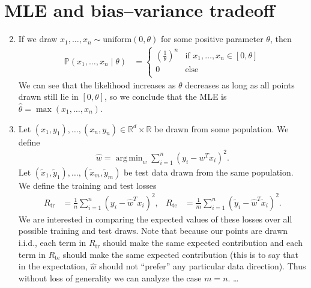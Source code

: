 \documentclass[11pt,letterpaper]{article}
\DeclareMathOperator*{\argmin}{arg\,min}
\numberwithin{equation}{section}
\numberwithin{figure}{section}
\begin{document}
\section{MLE and bias--variance tradeoff}

\begin{enumerate}[label=\arabic*.]
	\setcounter{enumi}{1}
	\item If we draw $x_1,\ldots,x_n \sim \text{uniform}(0,\theta)$ for some positive parameter $\theta$, then
	\begin{align*}
		\mathbb{P}(x_1,\ldots,x_n \mid \theta) &= \left\{\begin{array}{ll}
			\left(\frac{1}{\theta}\right)^n & \text{if } x_1,\ldots,x_n \in [0,\theta]\\
			0 & \text{else}\\
			\end{array}\right.
	\end{align*}
	We can see that the likelihood increases as $\theta$ decreases as long as all points drawn still lie in $[0,\theta]$, so we conclude that the MLE is $\hat{\theta} = \max(x_1,\ldots,x_n)$.




















	\item Let $(x_1,y_1),\ldots,(x_n,y_n) \in \mathbb{R}^d \times \mathbb{R}$ be drawn from some population. We define
	\begin{align*}
	\hat{w} = \argmin_{w} \sum_{i=1}^n (y_i - w^T x_i)^2.
	\end{align*}
	Let $(\tilde{x}_1,\tilde{y}_1),\ldots,(\tilde{x}_m,\tilde{y}_m)$ be test data drawn from the same population. We define the training and test losses
	\begin{align*}
		R_\mathrm{tr} &= \frac{1}{n} \sum_{i=1}^n \left(y_i - \hat{w}^T x_i\right)^2,&
		R_\mathrm{te} &= \frac{1}{m} \sum_{i=1}^n \left(\tilde{y}_i - \hat{w}^T \tilde{x}_i\right)^2.
	\end{align*}
	We are interested in comparing the expected values of these losses over all possible training and test draws. Note that because our points are drawn i.i.d., each term in $R_\mathrm{tr}$ should make the same expected contribution and each term in $R_\mathrm{te}$ should make the same expected contribution (this is to say that in the expectation, $\hat{w}$ should not ``prefer'' any particular data direction). Thus without loss of generality we can analyze the case $m=n$. \ldots
\end{enumerate}
\end{document}
